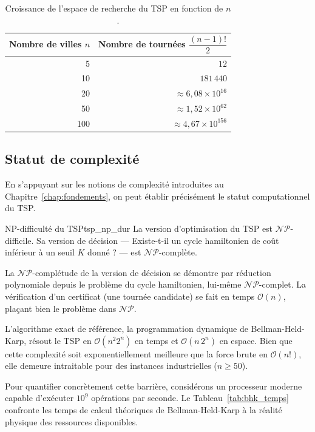 \documentclass[12pt, a4paper, twoside, openright]{book}
\begin{document}
	\begin{table}[htbp	]
		\centering
		\caption{Croissance de l'espace de recherche du TSP en fonction de $n$.}
		\label{tab:tsp_espace}
		\begin{tabular}{rr}
			\toprule
			\textbf{Nombre de villes} $n$ & \textbf{Nombre de tournées}
			$\dfrac{(n-1)!}{2}$ \\
			\midrule
			5   & $12$ \\
			10  & $181\,440$ \\
			20  & $\approx 6{,}08 \times 10^{16}$ \\
			50  & $\approx 1{,}52 \times 10^{62}$ \\
			100 & $\approx 4{,}67 \times 10^{156}$ \\
			\bottomrule
		\end{tabular}
	\end{table}	
	\subsection{Statut de complexit\'e}
	\label{subsec:tsp_np}	
	En s'appuyant sur les notions de complexité introduites au
	Chapitre~\ref{chap:fondements}, on peut établir précisément le statut
	computationnel du TSP.	
	\begin{theorem}{NP-difficulté du TSP}{tsp_np_dur}
		La version d'optimisation du TSP est $\mathcal{NP}$-difficile. Sa
		version de décision --- \og Existe-t-il un cycle hamiltonien de coût
		inférieur à un seuil $K$ donné ? \fg{} --- est $\mathcal{NP}$-complète.
	\end{theorem}	
	La $\mathcal{NP}$-complétude de la version de décision se démontre par
	réduction polynomiale depuis le problème du cycle hamiltonien, lui-même
	$\mathcal{NP}$-complet. La vérification d'un certificat (une tournée
	candidate) se fait en temps $\mathcal{O}(n)$, plaçant bien le problème dans
	$\mathcal{NP}$.
	
	L'algorithme exact de référence, la programmation dynamique de
	Bellman-Held-Karp, résout le TSP en $\mathcal{O}(n^2 2^n)$ en temps et
	$\mathcal{O}(n\, 2^n)$ en espace. Bien que cette complexité soit
	exponentiellement meilleure que la force brute en $\mathcal{O}(n!)$, elle
	demeure intraitable pour des instances industrielles ($n \geq 50$).
	
	Pour quantifier concrètement cette barrière, considérons un processeur
	moderne capable d'exécuter $10^9$ opérations par seconde.
	Le Tableau~\ref{tab:bhk_temps} confronte les temps de calcul théoriques
	de Bellman-Held-Karp à la réalité physique des ressources disponibles.
	
\end{document}
